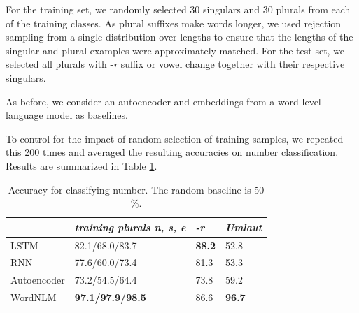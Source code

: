 For the training set, we randomly selected 30 singulars and 30 plurals from each of the training classes.
As plural suffixes make words longer, we used rejection sampling from a single distribution over lengths to ensure that the lengths of the singular and plural examples were approximately matched.
For the test set, we selected all plurals with -\emph{r} suffix or vowel change together with their respective singulars.

As before, we consider an autoencoder and embeddings from a word-level language model as baselines.

To control for the impact of random selection of training samples, we repeated this 200 times and averaged the resulting accuracies on number classification.
Results are summarized in Table \ref{tab:number-results}.


\begin{table}[t]
  \begin{center}
    \begin{tabular}{l|l|l|l}
      \multicolumn{1}{c}{}&\emph{training plurals n, s, e}&\emph{-r}&\emph{Umlaut}\\
      \hline
      LSTM& 82.1/68.0/83.7  & \textbf{88.2} & 52.8 \\
      RNN& 77.6/60.0/73.4 & 81.3 & 53.3\\
      Autoencoder& 73.2/54.5/64.4 & 73.8 & 59.2\\
      WordNLM& \textbf{97.1/97.9/98.5} & 86.6 & \textbf{96.7}  \\ %
    \end{tabular}
  \end{center}
  \caption{\label{tab:number-results} Accuracy for classifying number. The random baseline is 50 \%.}
\end{table}



